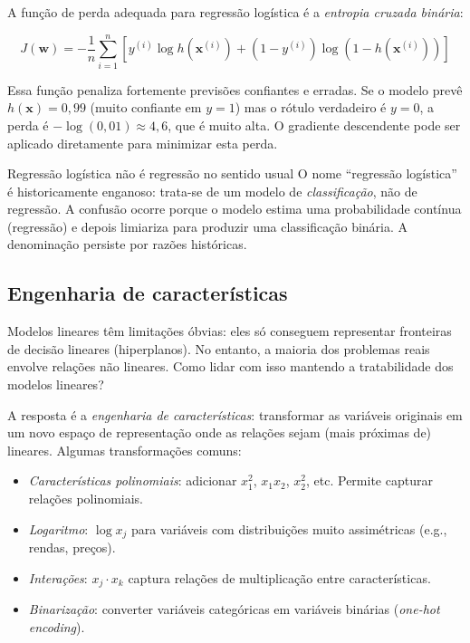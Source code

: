 \documentclass[12pt,a4paper]{article}
\begin{document}
A função de perda adequada para regressão logística é a \emph{entropia cruzada binária}:

\[
J(\mathbf{w}) = -\frac{1}{n} \sum_{i=1}^n \left[ y^{(i)} \log h(\mathbf{x}^{(i)}) + (1 - y^{(i)}) \log(1 - h(\mathbf{x}^{(i)})) \right]
\]

Essa função penaliza fortemente previsões confiantes e erradas. Se o modelo prevê $h(\mathbf{x}) = 0{,}99$ (muito confiante em $y=1$) mas o rótulo verdadeiro é $y=0$, a perda é $-\log(0{,}01) \approx 4{,}6$, que é muito alta. O gradiente descendente pode ser aplicado diretamente para minimizar esta perda.

\begin{notabox}{Regressão logística não é regressão no sentido usual}
O nome ``regressão logística'' é historicamente enganoso: trata-se de um modelo de \emph{classificação}, não de regressão. A confusão ocorre porque o modelo estima uma probabilidade contínua (regressão) e depois limiariza para produzir uma classificação binária. A denominação persiste por razões históricas.
\end{notabox}

\subsection{Engenharia de características}
\label{subsec:feat-eng}

Modelos lineares têm limitações óbvias: eles só conseguem representar fronteiras de decisão lineares (hiperplanos). No entanto, a maioria dos problemas reais envolve relações não lineares. Como lidar com isso mantendo a tratabilidade dos modelos lineares?

A resposta é a \emph{engenharia de características}: transformar as variáveis originais em um novo espaço de representação onde as relações sejam (mais próximas de) lineares. Algumas transformações comuns:

\begin{itemize}
    \item \emph{Características polinomiais}: adicionar $x_1^2$, $x_1 x_2$, $x_2^2$, etc. Permite capturar relações polinomiais.
    \item \emph{Logaritmo}: $\log x_j$ para variáveis com distribuições muito assimétricas (e.g., rendas, preços).
    \item \emph{Interações}: $x_j \cdot x_k$ captura relações de multiplicação entre características.
    \item \emph{Binarização}: converter variáveis categóricas em variáveis binárias (\textit{one-hot encoding}).
\end{itemize}
\end{document}
